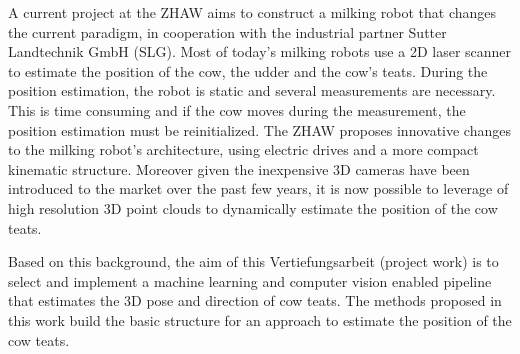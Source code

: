 A current project at the ZHAW aims to construct a milking robot that changes the current paradigm, in cooperation with the industrial partner Sutter Landtechnik GmbH (SLG). Most of today's milking robots use a 2D laser scanner to estimate the position of the cow, the udder and the cow's teats. During the position estimation, the robot is static and several measurements are necessary. This is time consuming and if the cow moves during the measurement, the position estimation must be reinitialized. The ZHAW proposes innovative changes to the milking robot's architecture, using electric drives and a more compact kinematic structure. Moreover given the inexpensive 3D cameras have been introduced to the market over the past few years, it is now possible to leverage of high resolution 3D point clouds to dynamically estimate the position of the cow teats.

Based on this background, the aim of this Vertiefungsarbeit (project work) is to select and implement a machine learning and computer vision enabled pipeline that estimates the 3D pose and direction of cow teats. The methods proposed in this work build the basic structure for an approach to estimate the position of the cow teats.

    
    
    
    

